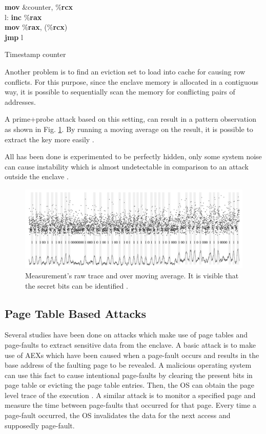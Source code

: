 \begin{algorithm}[t]
	\textbf{mov} \&counter, \%\textbf{rcx}\\
	l: \textbf{inc} \%\textbf{rax}\\
	\textbf{mov} \%\textbf{rax}, (\%\textbf{rcx})\\
	\textbf{jmp} l
	\caption{Timestamp counter \cite{mge}}
	\label{alg:timer}
\end{algorithm}

Another problem is to find an eviction set to load into cache for causing row conflicts. For this purpose, since the enclave memory is allocated in a contiguous way, it is possible to sequentially scan the memory for conflicting pairs of addresses. 

A prime+probe attack based on this setting, can result in a pattern observation as shown in Fig. \ref{fig:ppres}. By running a moving average on the result, it is possible to extract the key more easily \cite{mge}.

All has been done is experimented to be perfectly hidden, only some system noise can cause instability which is almost undetectable in comparison to an attack outside the enclave \cite{mge}.

\begin{figure}
	\includegraphics[scale=0.25]{images/ppres}
	\caption{Measurement's raw trace and over moving average. It is visible that the secret bits can be identified \cite{mge}.}
	\label{fig:ppres}
\end{figure}

\subsection{Page Table Based Attacks}
Several studies have been done on attacks which make use of page tables and page-faults to extract sensitive data from the enclave. A basic attack is to make use of AEXs which have been caused when a page-fault occurs and results in the base address of the faulting page to be revealed. A malicious operating system can use this fact to cause intentional page-faults by clearing the present bits in page table or evicting the page table entries. Then, the OS can obtain the page level trace of the execution \cite{stealthy}. A similar attack is to monitor a specified page and measure the time between page-faults that occurred for that page. Every time a page-fault occurred, the OS invalidates the data for the next access and supposedly page-fault.

